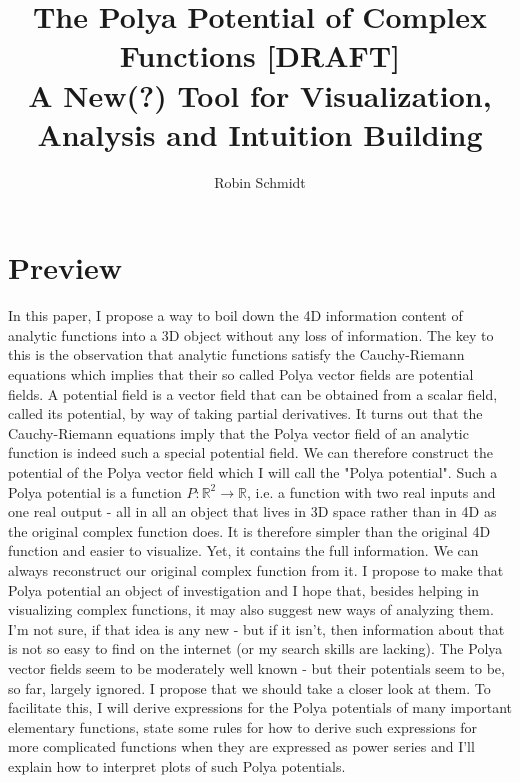 \documentclass[12pt]{article}
\begin{document}
\parindent=0in
\parskip=0pt

 \setcounter{page}{1}

\title{The Polya Potential of Complex Functions [DRAFT]\\ {\Large A New(?) Tool for Visualization, Analysis and Intuition Building}}
\author{Robin Schmidt}
\maketitle

\section{Preview}
In this paper, I propose a way to boil down the 4D information content of analytic functions into a 3D object without any loss of information. The key to this is the observation that analytic functions satisfy the Cauchy-Riemann equations which implies that their so called Polya vector fields are potential fields. A potential field is a vector field that can be obtained from a scalar field, called its potential, by way of taking partial derivatives. It turns out that the Cauchy-Riemann equations imply that the Polya vector field of an analytic function is indeed such a special potential field. We can therefore construct the potential of the Polya vector field which I will call the "Polya potential". Such a Polya potential is a function $P: \mathbb{R}^2 \rightarrow \mathbb{R}$, i.e. a function with two real inputs and one real output - all in all an object that lives in 3D space rather than in 4D as the original complex function does. It is therefore simpler than the original 4D function and easier to visualize. Yet, it contains the full information. We can always reconstruct our original complex function from it. I propose to make that Polya potential an object of investigation and I hope that, besides helping in visualizing complex functions, it may also suggest new ways of analyzing them. I'm not sure, if that idea is any new - but if it isn't, then information about that is not so easy to find on the internet (or my search skills are lacking). The Polya vector fields seem to be moderately well known - but their potentials seem to be, so far, largely ignored. I propose that we should take a closer look at them. To facilitate this, I will derive expressions for the Polya potentials of many important elementary functions, state some rules for how to derive such expressions for more complicated functions when they are expressed as power series and I'll explain how to interpret plots of such Polya potentials. 
\end{document}
